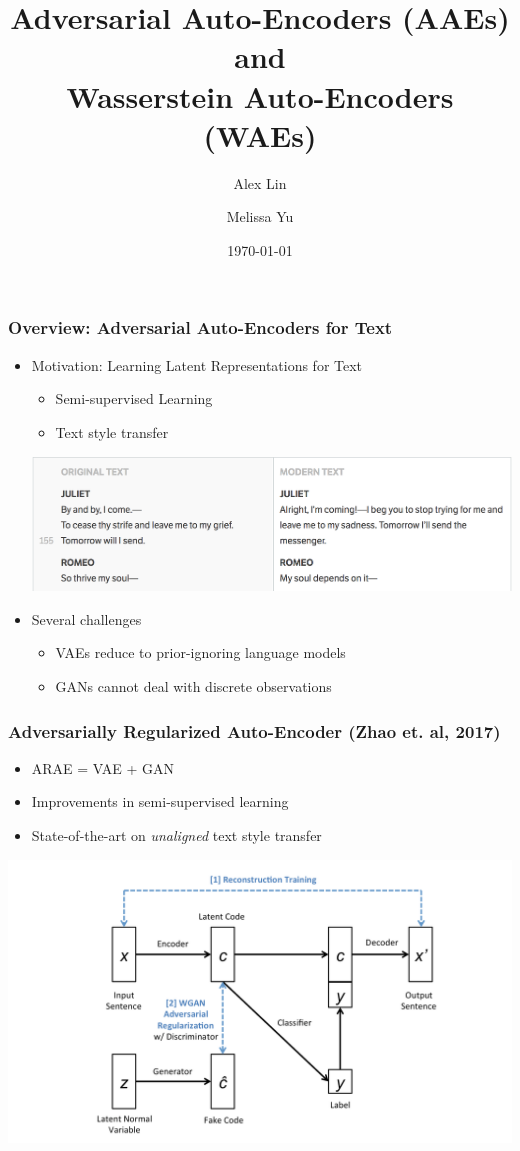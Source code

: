 \documentclass{beamer}
\title[AAEs for Text]{Adversarial Auto-Encoders (AAEs) and \\ Wasserstein Auto-Encoders (WAEs)}
\author[A. Lin \and M. Yu]{Alex Lin \and Melissa Yu}
\institute[Harvard University]{Harvard University}
\date{\today}
\begin{document}
\begin{frame}
\frametitle{Overview: Adversarial Auto-Encoders for Text} 
\begin{itemize}
\item Motivation: Learning Latent Representations for Text
\begin{itemize}
\item Semi-supervised Learning
\item Text style transfer
\end{itemize}

\begin{center}
\includegraphics[scale=0.4]{shakespeare}
\end{center}

\item Several challenges
\begin{itemize}
\item VAEs reduce to prior-ignoring language models
\item GANs cannot deal with discrete observations
\end{itemize}
\end{itemize}
\end{frame}

\begin{frame}
\frametitle{Adversarially Regularized Auto-Encoder (Zhao et. al, 2017)} 
\begin{itemize}
\item ARAE = VAE + GAN
\item Improvements in semi-supervised learning
\item State-of-the-art on \emph{unaligned} text style transfer 
\end{itemize}
\begin{center}
\includegraphics[scale=0.15]{arae}
\end{center}
\end{frame}
\end{document}
